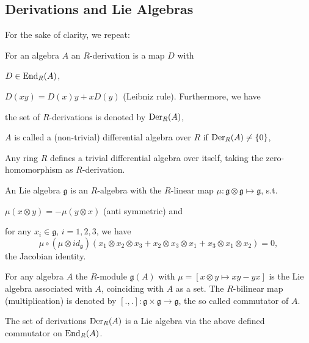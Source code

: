 \subsection{Derivations and Lie Algebras}
For the sake of clarity, we repeat:
\begin{defi}\label{defi05}
For an algebra $A$ an $R$-derivation is a map $D$ with
\bn
\item $D \in \mathrm{End}_R(A)$,
\item $D(x y) = D(x) y + x D(y)$ (Leibniz rule).
\en
Furthermore, we have
\bn
\item the set of $R$-derivations is denoted by $\mathrm{Der}_R(A)$,
\item $A$ is called a (non-trivial) differential algebra over $R$ if $\mathrm{Der}_R(A) \neq \{0\}$,
\en
{}
\end{defi}
Any ring $R$ defines a trivial differential algebra over itself, taking the zero-homomorphism as $R$-derivation.
\begin{defi}\label{defi06}
An Lie algebra $\mathfrak{g}$ is an $R$-algebra with the $R$-linear map $\mu : \mathfrak{g} \otimes \mathfrak{g} \longmapsto \mathfrak{g}$, s.t.
\bn
\item $\mu(x \otimes y) = -\mu(y \otimes x)$ (anti symmetric) and
\item for any $x_i \in \mathfrak{g}$, $i = 1, 2, 3$, we have
$$\mu \circ(\mu \otimes id_\mathfrak{g})(x_1 \otimes x_2 \otimes x_3 + x_2 \otimes x_3 \otimes x_1 + x_3 \otimes x_1 \otimes x_2) = 0,$$ 
the Jacobian identity.
\item \label{LieAlgFromAlg} For any algebra $A$ the $R$-module $\mathfrak{g}(A)$ with $\mu = [x \otimes y \longmapsto x y - y x]$ is the Lie algebra associated with $A$, coinciding with $A$ as a set. The $R$-bilinear map (multiplication) is denoted by $[.,.] : \mathfrak{g} \times \mathfrak{g}\longrightarrow \mathfrak{g}$, the so called commutator of $A$.
\en
{}
\end{defi}
\begin{koro}\label{koro02}
The set of derivations $\mathrm{Der}_R(A)$ is a Lie algebra via the above defined commutator on $\mathrm{End}_R(A)$.
\end{koro}
